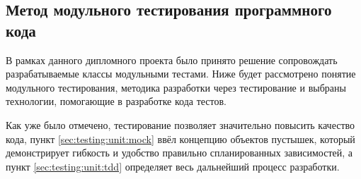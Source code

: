 \subsection{Метод модульного тестирования программного кода}
\label{sec:testing:unit}

В рамках данного дипломного проекта было принято решение сопровождать разрабатываемые классы модульными тестами. Ниже будет рассмотрено понятие модульного тестирования, методика разработки через тестирование и выбраны технологии, помогающие в разработке кода тестов.





Как уже было отмечено, тестирование позволяет значительно повысить качество кода, пункт \ref{sec:testing:unit:mock} ввёл концепцию объектов пустышек, который демонстрирует гибкость и удобство правильно спланированных зависимостей, а пункт \ref{sec:testing:unit:tdd} определяет весь дальнейший процесс разработки.